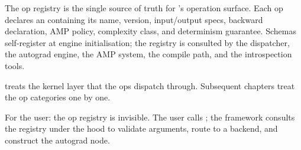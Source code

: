 The op registry is the single source of truth for \Lucid's
operation surface. Each op declares an  containing
its name, version, input/output specs, backward declaration, AMP
policy, complexity class, and determinism guarantee. Schemas
self-register at engine initialisation; the registry is consulted
by the dispatcher, the autograd engine, the AMP system, the compile
path, and the introspection tools.

 treats the kernel layer that the ops
dispatch through. Subsequent chapters treat the op categories one
by one.

\begin{lucidnote}
For the user: the op registry is invisible. The user calls
; the framework consults the registry under
the hood to validate arguments, route to a backend, and construct
the autograd node.
\end{lucidnote}

